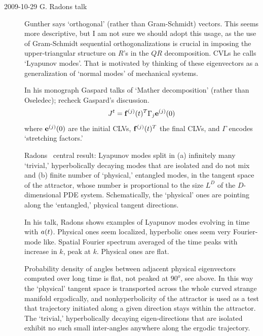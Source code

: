 \begin{description}
\item[2009-10-29 G. Radons talk]  Gunther says `orthogonal'
(rather than Gram-Schmidt) vectors. This seems more
descriptive, but I am not sure we should adopt this usage, as
the use of Gram-Schmidt sequential orthogonalizations is
crucial in imposing the upper-triangular structure on $R$'s in
the $QR$ decomposition. CVLs he calls  `Lyapunov modes'. That is
motivated by thinking of these eigenvectors as a generalization
of `normal modes' of mechanical systems.						\toCB

In his monograph Gaspard talks of `Mather
decomposition' (rather than Oseledec); recheck Gaspard's
discussion.
\[
J^t = {\bf f}^{(j)}(t){}^T \Gamma_j {\bf e}^{(j)}(0)
\]
where ${\bf e}^{(j)}(0)$ are the initial CLVs,
${\bf f}^{(j)}(t){}^T$ the final CLVs, and $\Gamma$ encodes
`stretching factors.'

Radons \etal\ central result: Lyapunov modes split in (a)
infinitely many `trivial,' hyperbolically decaying modes that
are isolated and do not mix and (b) finite number of
`physical,' entangled modes, in the tangent space of the
attractor, whose number is proportional to the size $L^D$ of
the $D$-dimensional PDE system. Schematically, the `physical'
ones are pointing along the `entangled,' physical tangent
directions.

In his talk, Radons shows examples of Lyapunov modes evolving
in time with $a(t)$. Physical ones seem localized,
hyperbolic ones seem very Fourier-mode like. Spatial Fourier
spectrum averaged of the time peaks with increase in $k$, peak
at $k$. Physical ones are flat.

Probability density of angles between adjacent physical
eigenvectors computed over long time is flat, not peaked at
$90^o$, see  above. In this way the
`physical' tangent space is transported across the whole curved
strange manifold ergodically, and nonhyperbolicity of the
attractor is used as a test that trajectory initiated along a
given direction stays within the attractor. The `trivial,'
hyperbolically decaying eigen-directions that are isolated
exhibit no such small inter-angles anywhere along the ergodic
trajectory.


\end{description}
